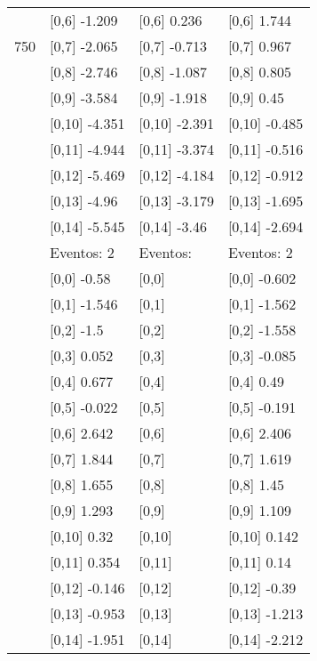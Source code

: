 \begin{table}
\begin{tabular}[t]{llll}
 & {}[0,6] -1.209 & {}[0,6] 0.236 & {}[0,6] 1.744\\
750 & {}[0,7] -2.065 & {}[0,7] -0.713 & {}[0,7] 0.967\\
\addlinespace
 & {}[0,8] -2.746 & {}[0,8] -1.087 & {}[0,8] 0.805\\
 & {}[0,9] -3.584 & {}[0,9] -1.918 & {}[0,9] 0.45\\
 & {}[0,10] -4.351 & {}[0,10] -2.391 & {}[0,10] -0.485\\
 & {}[0,11] -4.944 & {}[0,11] -3.374 & {}[0,11] -0.516\\
 & {}[0,12] -5.469 & {}[0,12] -4.184 & {}[0,12] -0.912\\
\addlinespace
 & {}[0,13] -4.96 & {}[0,13] -3.179 & {}[0,13] -1.695\\
 & {}[0,14] -5.545 & {}[0,14] -3.46 & {}[0,14] -2.694\\
 & Eventos:  2 & Eventos: & Eventos:  2\\
 & {}[0,0] -0.58 & {}[0,0] & {}[0,0] -0.602\\
 & {}[0,1] -1.546 & {}[0,1] & {}[0,1] -1.562\\
\addlinespace
 & {}[0,2] -1.5 & {}[0,2] & {}[0,2] -1.558\\
 & {}[0,3] 0.052 & {}[0,3] & {}[0,3] -0.085\\
 & {}[0,4] 0.677 & {}[0,4] & {}[0,4] 0.49\\
 & {}[0,5] -0.022 & {}[0,5] & {}[0,5] -0.191\\
 & {}[0,6] 2.642 & {}[0,6] & {}[0,6] 2.406\\
\addlinespace
1000 & {}[0,7] 1.844 & {}[0,7] & {}[0,7] 1.619\\
 & {}[0,8] 1.655 & {}[0,8] & {}[0,8] 1.45\\
 & {}[0,9] 1.293 & {}[0,9] & {}[0,9] 1.109\\
 & {}[0,10] 0.32 & {}[0,10] & {}[0,10] 0.142\\
 & {}[0,11] 0.354 & {}[0,11] & {}[0,11] 0.14\\
\addlinespace
 & {}[0,12] -0.146 & {}[0,12] & {}[0,12] -0.39\\
 & {}[0,13] -0.953 & {}[0,13] & {}[0,13] -1.213\\
 & {}[0,14] -1.951 & {}[0,14] & {}[0,14] -2.212\\
\bottomrule
\end{tabular}
\end{table}
